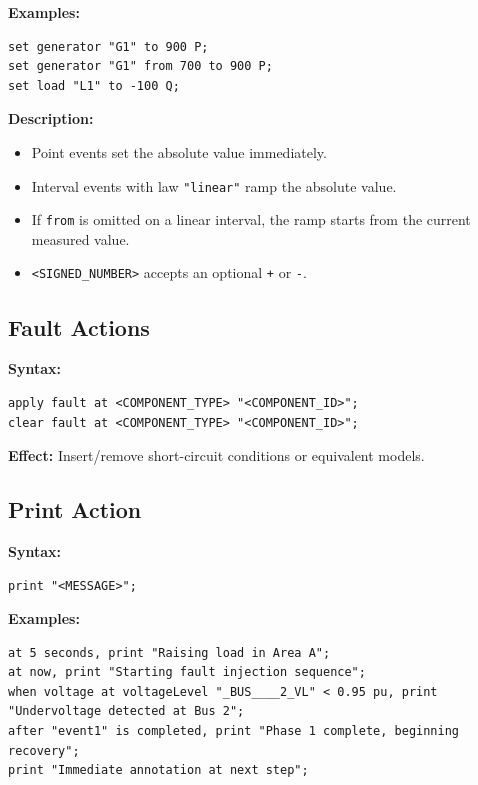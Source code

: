 \documentclass[12pt]{article}
\begin{document}
\textbf{Examples:}
\begin{lstlisting}
set generator "G1" to 900 P;
set generator "G1" from 700 to 900 P;
set load "L1" to -100 Q;
\end{lstlisting}

\textbf{Description:}
\begin{itemize}
  \item Point events set the absolute value immediately.
  \item Interval events with law \texttt{"linear"} ramp the absolute value.
  \item If \texttt{from} is omitted on a linear interval, the ramp starts from the current measured value.
  \item \texttt{<SIGNED\_NUMBER>} accepts an optional \texttt{+} or \texttt{-}.
\end{itemize}

\subsection{Fault Actions}

\textbf{Syntax:}
\begin{lstlisting}
apply fault at <COMPONENT_TYPE> "<COMPONENT_ID>";
clear fault at <COMPONENT_TYPE> "<COMPONENT_ID>";
\end{lstlisting}

\textbf{Effect:} Insert/remove short-circuit conditions or equivalent models.

\subsection{Print Action}

\textbf{Syntax:}
\begin{lstlisting}
print "<MESSAGE>";
\end{lstlisting}

\textbf{Examples:}
\begin{lstlisting}
at 5 seconds, print "Raising load in Area A";
at now, print "Starting fault injection sequence";
when voltage at voltageLevel "_BUS____2_VL" < 0.95 pu, print "Undervoltage detected at Bus 2";
after "event1" is completed, print "Phase 1 complete, beginning recovery";
print "Immediate annotation at next step";
\end{lstlisting}
\end{document}
